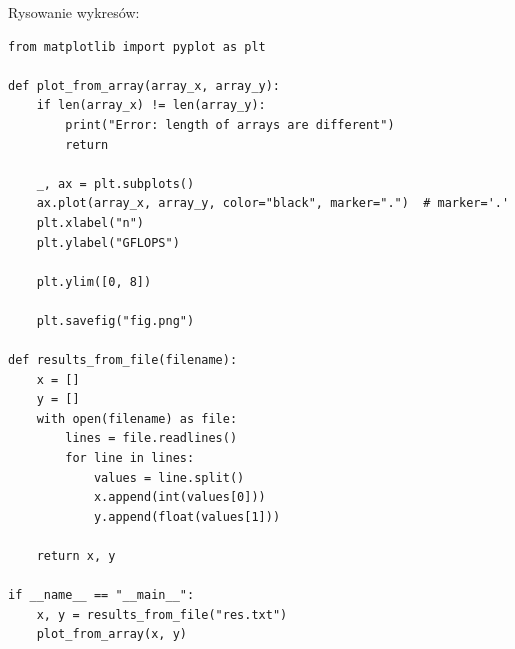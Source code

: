 \documentclass{article}
\begin{document}
Rysowanie wykresów:

\begin{verbatim}
from matplotlib import pyplot as plt

def plot_from_array(array_x, array_y):
    if len(array_x) != len(array_y):
        print("Error: length of arrays are different")
        return

    _, ax = plt.subplots()
    ax.plot(array_x, array_y, color="black", marker=".")  # marker='.'
    plt.xlabel("n")
    plt.ylabel("GFLOPS")

    plt.ylim([0, 8])

    plt.savefig("fig.png")

def results_from_file(filename):
    x = []
    y = []
    with open(filename) as file:
        lines = file.readlines()
        for line in lines:
            values = line.split() 
            x.append(int(values[0]))
            y.append(float(values[1]))

    return x, y

if __name__ == "__main__":
    x, y = results_from_file("res.txt")
    plot_from_array(x, y)
\end{verbatim}
\end{document}
